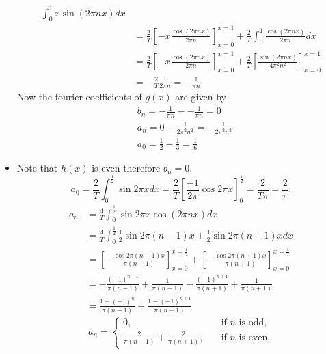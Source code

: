 \documentclass[11pt]{article}
\begin{document}
\begin{solution}
\begin{itemize}
\begin{align*}
            \int_{0}^{1} x \sin(2\pi n x) dx
            \\&
            =
            \frac{2}{T}
            \left[- x \frac{ \cos(2\pi n x) }{ 2\pi n } \right]_{x=0}^{x=1}
            +
            \frac{2}{T}
            \int_{0}^{1} \frac{ \cos(2\pi n x) }{ 2\pi n } dx
            \\&
            =
           \frac{2}{T}
            \left[- x \frac{ \cos(2\pi n x) }{ 2\pi n } \right]_{x=0}^{x=1}
            +
            \frac{2}{T}
            \left[ \frac{ \sin(2\pi n x) }{ 4\pi^2 n^2 } \right]_{x=0}^{x=1}
	\\&
	= 
	-\frac{2}{T}\frac{1}{2\pi n} =  -\frac{1}{\pi n} 
        \end{align*}	
	Now the fourier coefficients of $g(x)$ are given by
        \begin{align*}
            &b_n = -\frac{1}{\pi n} - - \frac{1}{\pi n} = 0
            \\& 
	a_n = 0 - \frac{1}{2\pi^2 n^2} =  - \frac{1}{2\pi^2 n^2} 
            \\&
	a_0 = \frac{1}{2} - \frac{1}{3} = \frac{1}{6}
        \end{align*}	
	\item
Note that $h(x)$ is even therefore $b_n = 0$. 
	\[
            a_0 = \frac{2}{T} \int_{0}^{\frac 1 2} \sin 2\pi x dx  =  \frac 2 T\left[ \frac{-1}{2\pi} \cos{2\pi x} \right]_{0}^{\frac 1 2} =\frac{2}{T \pi} = \frac{2}{\pi} .
        \]
        \begin{align*}
            a_n 
            &
            = 
            \frac{4}{T}
            \int_{0}^{\frac 1 2} \sin 2\pi x \cos(2\pi n x) dx
            \\&
            =
            \frac{4}{T}
            \int_{0}^{\frac 1 2} \frac 1 2 \sin{2\pi(n-1)x} + \frac 1 2 \sin{2\pi(n+1)x} dx
            \\&
            =
            \left[- \frac{ \cos2\pi(n-1)x }{ \pi(n-1) } \right]_{x=0}^{x=\frac 1 2}
            +
            \left[- \frac{ \cos2\pi(n+1)x }{ \pi(n+1) } \right]_{x=0}^{x=\frac 1 2}
	\\&
	= 
	-\frac{(-1)^{n-1}}{\pi(n-1)} +  \frac{1}{\pi(n-1)}  - \frac{(-1)^{n+1}}{\pi(n+1)} + \frac{1}{\pi(n+1)}
	\\&
	= \frac{1+(-1)^{n}}{\pi(n-1)} +  \frac{1-(-1)^{n+1}}{\pi(n+1)} 
        \end{align*}	
$$a_n = 
\begin{cases}
0 ,\quad &\text{if } n\text{ is odd,}\\
\frac{2}{\pi(n-1)} + \frac{2}{\pi(n+1)}  ,\quad &\text{if } n\text{ is even,}
\end{cases}
$$
       \end{itemize}

\end{solution}
\end{document}
